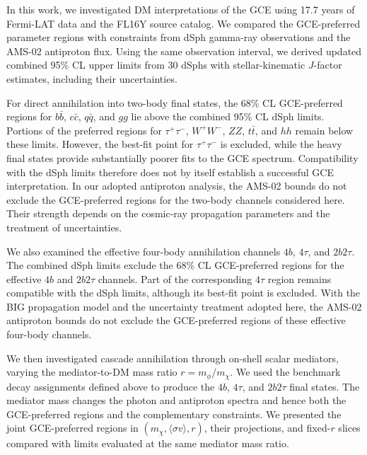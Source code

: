 \documentclass[superscriptaddress,
showpacs,preprintnumbers,nofootinbib,eqsecnum,amsmath,amssymb,aps,11pt, groupedaddress, floatfix]{revtex4-2}
\begin{document}
In this work, we investigated DM interpretations of the GCE using 17.7 years of Fermi-LAT data and the FL16Y source catalog.
We compared the GCE-preferred parameter regions with constraints from dSph gamma-ray observations and the AMS-02 antiproton flux.
Using the same observation interval, we derived updated combined 95\% CL upper limits from 30 dSphs with stellar-kinematic $J$-factor estimates, including their uncertainties.

For direct annihilation into two-body final states, the 68\% CL GCE-preferred regions for $b\bar b$, $c\bar c$, $q\bar q$, and $gg$ lie above the combined 95\% CL dSph limits.
Portions of the preferred regions for $\tau^+\tau^-$, $W^+W^-$, $ZZ$, $t\bar t$, and $hh$ remain below these limits.
However, the best-fit point for $\tau^+\tau^-$ is excluded, while the heavy final states provide substantially poorer fits to the GCE spectrum.
Compatibility with the dSph limits therefore does not by itself establish a successful GCE interpretation.
In our adopted antiproton analysis, the AMS-02 bounds do not exclude the GCE-preferred regions for the two-body channels considered here.
Their strength depends on the cosmic-ray propagation parameters and the treatment of uncertainties.

We also examined the effective four-body annihilation channels $4b$, $4\tau$, and $2b2\tau$.
The combined dSph limits exclude the 68\% CL GCE-preferred regions for the effective $4b$ and $2b2\tau$ channels.
Part of the corresponding $4\tau$ region remains compatible with the dSph limits, although its best-fit point is excluded.
With the BIG propagation model and the uncertainty treatment adopted here, the AMS-02 antiproton bounds do not exclude the GCE-preferred regions of these effective four-body channels.

We then investigated cascade annihilation through on-shell
scalar mediators, varying the mediator-to-DM mass ratio $r=m_\phi/m_\chi$.
We used the benchmark decay assignments defined above to
produce the $4b$, $4\tau$, and $2b2\tau$ final states.
The mediator mass changes the photon and antiproton spectra and hence both the GCE-preferred regions and the complementary constraints.
We presented the joint GCE-preferred regions in $(m_\chi,\langle\sigma v\rangle,r)$, their projections, and fixed-$r$ slices compared with limits evaluated at the same mediator mass ratio.
\end{document}
